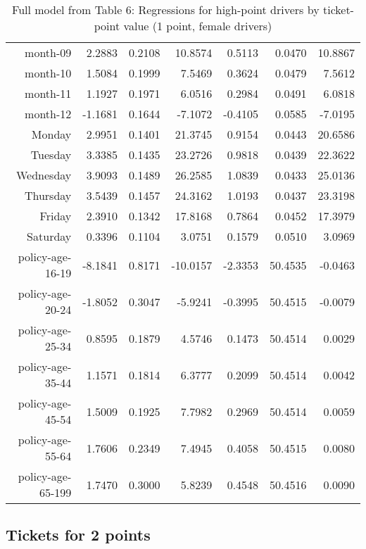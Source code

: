 \documentclass[10pt]{article}
\begin{document}
\begin{table}[ht]
\begin{tabular}{rrrrrrr}
  month-09 & 2.2883 & 0.2108 & 10.8574 & 0.5113 & 0.0470 & 10.8867 \\ 
  month-10 & 1.5084 & 0.1999 & 7.5469 & 0.3624 & 0.0479 & 7.5612 \\ 
  month-11 & 1.1927 & 0.1971 & 6.0516 & 0.2984 & 0.0491 & 6.0818 \\ 
  month-12 & -1.1681 & 0.1644 & -7.1072 & -0.4105 & 0.0585 & -7.0195 \\ 
  Monday & 2.9951 & 0.1401 & 21.3745 & 0.9154 & 0.0443 & 20.6586 \\ 
  Tuesday & 3.3385 & 0.1435 & 23.2726 & 0.9818 & 0.0439 & 22.3622 \\ 
  Wednesday & 3.9093 & 0.1489 & 26.2585 & 1.0839 & 0.0433 & 25.0136 \\ 
  Thursday & 3.5439 & 0.1457 & 24.3162 & 1.0193 & 0.0437 & 23.3198 \\ 
  Friday & 2.3910 & 0.1342 & 17.8168 & 0.7864 & 0.0452 & 17.3979 \\ 
  Saturday & 0.3396 & 0.1104 & 3.0751 & 0.1579 & 0.0510 & 3.0969 \\ 
  policy-age-16-19 & -8.1841 & 0.8171 & -10.0157 & -2.3353 & 50.4535 & -0.0463 \\ 
  policy-age-20-24 & -1.8052 & 0.3047 & -5.9241 & -0.3995 & 50.4515 & -0.0079 \\ 
  policy-age-25-34 & 0.8595 & 0.1879 & 4.5746 & 0.1473 & 50.4514 & 0.0029 \\ 
  policy-age-35-44 & 1.1571 & 0.1814 & 6.3777 & 0.2099 & 50.4514 & 0.0042 \\ 
  policy-age-45-54 & 1.5009 & 0.1925 & 7.7982 & 0.2969 & 50.4514 & 0.0059 \\ 
  policy-age-55-64 & 1.7606 & 0.2349 & 7.4945 & 0.4058 & 50.4515 & 0.0080 \\ 
  policy-age-65-199 & 1.7470 & 0.3000 & 5.8239 & 0.4548 & 50.4516 & 0.0090 \\ 
   \hline
\end{tabular}
\caption{Full model from Table 6: Regressions for high-point drivers by ticket-point value (1 point, female drivers)} 
\label{tab_6_1_pts_F}
\end{table}


\clearpage
\pagebreak




\subsection*{Tickets for 2 points}
\end{document}
